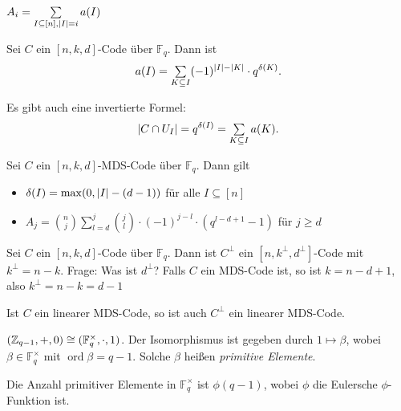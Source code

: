 \documentclass{cheat-sheet}
\newcommand{\F}{\mathbb{F}} %
\DeclareMathOperator{\ord}{ord} %
\begin{document}
\begin{bem}
  $A_i = \sum_{I \subseteq [n], \abs{I} = i} a(I)$
\end{bem}

\begin{satz}
  Sei $C$ ein $[n, k, d]$-Code über $\F_q$.
  Dann ist
  \[
    a(I) = \sum_{K \subseteq I} (-1)^{\abs{I} - \abs{K}} \cdot q^{\delta(K)}.
  \]
\end{satz}

\begin{bem}
  Es gibt auch eine invertierte Formel:
  \[
    \abs{C \cap U_I} = q^{\delta(I)} = \sum_{K \subseteq I} a(K).
  \]
\end{bem}


\begin{satz}
  Sei $C$ ein $[n, k, d]$-MDS-Code über $\F_q$. %
  Dann gilt
  \begin{itemize}
    \item $\delta(I) = \max ( 0, \lvert I\rvert - (d-1) )$ \enspace
    für alle $I \subseteq [n]$
    \item $A_j = \binom{n}{j} \sum_{l=d}^j \binom{j}{l} \cdot (-1)^{j-l} \cdot (q^{l-d+1} - 1)$ \enspace
    für $j \geq d$
  \end{itemize}
\end{satz}


Sei $C$ ein $[n, k, d]$-Code über $\F_q$.
Dann ist $C^\perp$ ein $[n, k^\perp, d^\perp]$-Code mit $k^\perp = n - k$.
Frage: Was ist $d^\perp$?
Falls $C$ ein MDS-Code ist, so ist $k = n - d + 1$, also $k^\perp = n - k = d - 1$

\begin{satz}
  Ist $C$ ein linearer MDS-Code, so ist auch $C^\perp$ ein linearer MDS-Code.
\end{satz}


\begin{lem}
  $(\Z_{q-1}, +, 0) \cong (\F_q^{\times}, \cdot, 1)$.
  Der Isomorphismus ist gegeben durch $1 \mapsto \beta$, wobei $\beta \in \F_q^{\times}$ mit $\ord{\beta} = q-1$.
  Solche $\beta$ heißen \emph{primitive Elemente}.
\end{lem}

\begin{bem}
  Die Anzahl primitiver Elemente in $\F_q^{\times}$ ist $\phi(q-1)$, wobei $\phi$ die Eulersche $\phi$-Funktion ist.
\end{bem}
\end{document}
